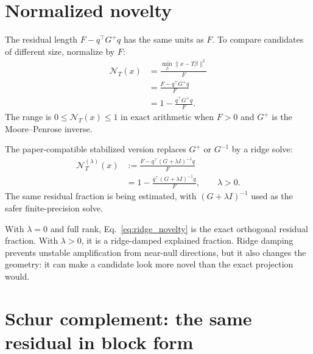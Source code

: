 \documentclass[10pt,twocolumn]{article}
\newcommand{\nov}{\mathcal N}
\begin{document}
\section{Normalized novelty}

The residual length $F-q^\top G^+q$ has the same units as $F$. To compare candidates of different size, normalize by $F$:
\begin{equation}
\begin{aligned}
\nov_T(x)
&=\frac{\min_\beta\|x-T\beta\|^2}{F}\\
&=\frac{F-q^\top G^+q}{F}\\
&=1-\frac{q^\top G^+q}{F}.
\end{aligned}
\label{eq:novelty_again}
\end{equation}
The range is $0\le \nov_T(x)\le1$ in exact arithmetic when $F>0$ and $G^+$ is the Moore--Penrose inverse.

The paper-compatible stabilized version replaces $G^+$ or $G^{-1}$ by a ridge solve:
\begin{equation}
\boxed{
\begin{aligned}
\nov_T^{(\lambda)}(x)
&:=\frac{F-q^\top(G+\lambda I)^{-1}q}{F}\\
&=1-\frac{q^\top(G+\lambda I)^{-1}q}{F},
\qquad \lambda>0.
\end{aligned}
}
\label{eq:ridge_novelty}
\end{equation}
The same residual fraction is being estimated, with $(G+\lambda I)^{-1}$ used as the safer finite-precision solve.

\begin{cautionbox}
With $\lambda=0$ and full rank, Eq.~\eqref{eq:ridge_novelty} is the exact orthogonal residual fraction. With $\lambda>0$, it is a ridge-damped explained fraction. Ridge damping prevents unstable amplification from near-null directions, but it also changes the geometry: it can make a candidate look more novel than the exact projection would.
\end{cautionbox}

\section{Schur complement: the same residual in block form}
\end{document}
